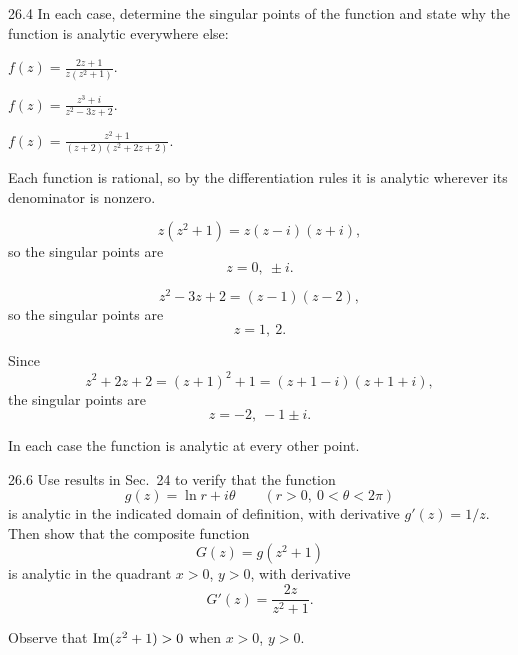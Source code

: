 \documentclass[11pt,oneside]{article}
\begin{document}

\begin{exercise}{26.4}
In each case, determine the singular points of the function and state why the function is analytic everywhere else:
\begin{exercisesubparts}
    \item \(\displaystyle f(z)=\frac{2z+1}{z(z^2+1)}\).
    \item \(\displaystyle f(z)=\frac{z^3+i}{z^2-3z+2}\).
    \item \(\displaystyle f(z)=\frac{z^2+1}{(z+2)(z^2+2z+2)}\).
\end{exercisesubparts}
\end{exercise}

\begin{solution}
Each function is rational, so by the differentiation rules it is analytic wherever its denominator is nonzero.
\begin{exercisesubparts}
    \item
    \[
        z(z^2+1)=z(z-i)(z+i),
    \]
    so the singular points are
    \[
        \boxed{z=0, \ \pm i}.
    \]

    \item
    \[
        z^2-3z+2=(z-1)(z-2),
    \]
    so the singular points are
    \[
        \boxed{z=1, \ 2}.
    \]

    \item Since
    \[
        z^2+2z+2=(z+1)^2+1=(z+1-i)(z+1+i),
    \]
    the singular points are
    \[
        \boxed{z=-2, \ -1\pm i}.
    \]
\end{exercisesubparts}
In each case the function is analytic at every other point.
\end{solution}

\begin{exercise}{26.6}
Use results in Sec.~24 to verify that the function
\[
    g(z)=\ln r+i\theta
    \qquad(r>0, \ 0<\theta<2\pi)
\]
is analytic in the indicated domain of definition, with derivative \(g'(z)=1/z\). Then show that the composite function
\[
    G(z)=g(z^2+1)
\]
is analytic in the quadrant \(x>0\), \(y>0\), with derivative
\[
    G'(z)=\frac{2z}{z^2+1}.
\]
\begin{suggestion}
Observe that \(\operatorname{Im}(z^2+1)>0\) when \(x>0\), \(y>0\).
\end{suggestion}
\end{exercise}
\end{document}
